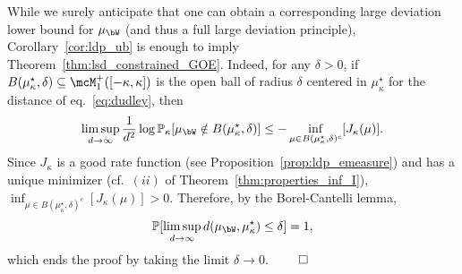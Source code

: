 \noindent
{}
While we surely anticipate that one can obtain a corresponding large deviation lower bound for $\mu_\bW$ (and thus a full large deviation principle), 
Corollary~\ref{cor:ldp_ub} is enough to imply Theorem~\ref{thm:lsd_constrained_GOE}.
Indeed, for any $\delta > 0$, if $B(\mu_\kappa^\star,\delta) \subseteq \mcM_1^+([-\kappa,\kappa])$ is the open ball of radius $\delta$ centered in $\mu_\kappa^\star$ for the distance of eq.~\eqref{eq:dudley}, 
then 
\begin{align*}
    \limsup_{d \to \infty} \frac{1}{d^2} \log \bbP_\kappa[\mu_\bW \notin B(\mu_\kappa^\star, \delta)] \leq - \inf_{\mu \in B(\mu_\kappa^\star, \delta)^c} [J_\kappa(\mu)].
\end{align*}
Since $J_\kappa$ is a good rate function (see Proposition~\ref{prop:ldp_emeasure}) and has a unique minimizer (cf.\ $(ii)$ of Theorem~\ref{thm:properties_inf_I}), 
$\inf_{\mu \in B(\mu_\kappa^\star, \delta)^c} [J_\kappa(\mu)] > 0$. Therefore, by the Borel-Cantelli lemma,
\begin{align*}
    \bbP[\limsup_{d \to \infty} d(\mu_\bW, \mu_\kappa^\star) \leq \delta] = 1,
\end{align*}
which ends the proof by taking the limit $\delta \to 0$.
$\qed$
